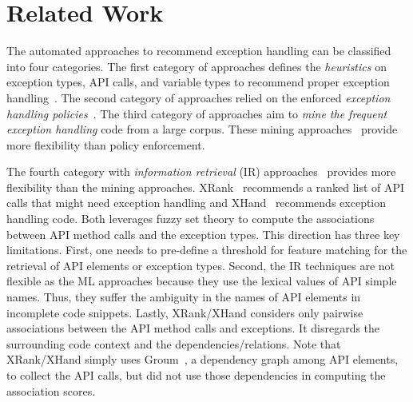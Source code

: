 \section{Related Work}
\label{sec:related}

The automated approaches to recommend exception handling can be
classified into four categories. The first category of approaches
defines the {\em heuristics} on exception types, API calls, and
variable types to recommend proper exception
handling~\cite{barbosa-bsse12}.
The second category of approaches relied on the enforced {\em
  exception handling policies}~\cite{barbosa-tse16,barbosa-saner18}.
The third category of approaches aim to {\em mine the frequent
  exception handling} code from a large corpus. These mining
approaches~\cite{chanchal-scam14} provide more flexibility than policy
enforcement.

The fourth category with {\em information retrieval} (IR)
approaches~\cite{xrank-fse20} provides more flexibility than the
mining approaches. XRank~\cite{xrank-fse20} recommends a ranked list
of API calls that might need exception handling and
XHand~\cite{xrank-fse20} recommends exception handling code. Both
leverages fuzzy set theory to compute the associations between API
method calls and the exception types. This direction has three key
limitations. First, one needs to pre-define a threshold for feature
matching for the retrieval of API elements or exception types. Second,
the IR techniques are not flexible as the ML approaches because they
use the lexical values of API simple names. Thus, they suffer the
ambiguity in the names of API elements in incomplete code
snippets. Lastly, XRank/XHand considers only pairwise associations
between the API method calls and exceptions. It disregards the
surrounding code context and the dependencies/relations. Note that
XRank/XHand simply uses Groum~\cite{fse09}, a dependency graph among
API elements, to collect the API calls, but did not use those
dependencies in computing the association scores.

